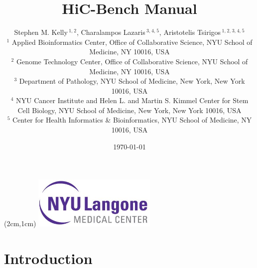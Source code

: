 \documentclass{article}\usepackage[]{graphicx}\usepackage[]{color}
\begin{document}


\title{HiC-Bench Manual}
\author{Stephen M. Kelly\,$^{1,}$$^{2}$, Charalampos Lazaris\,$^{3,}$$^{4,}$$^{5}$, Aristotelis Tsirigos\,$^{1,}$$^{2,}$$^{3,}$$^{4,}$$^{5}$
\\
\footnotesize $^{1}$ Applied Bioinformatics Center, Office of Collaborative Science, NYU School of Medicine, NY 10016, USA\\
\footnotesize $^{2}$ Genome Technology Center, Office of Collaborative Science, NYU School of Medicine, NY 10016, USA\\
\footnotesize $^{3}$ Department of Pathology, NYU School of Medicine, New York, New York 10016, USA\\
\footnotesize $^{4}$ NYU Cancer Institute and Helen L. and Martin S. Kimmel Center for Stem Cell Biology, NYU School of Medicine, New York, New York 10016, USA\\
\footnotesize $^{5}$ Center for Health Informatics \& Bioinformatics, NYU School of Medicine, NY 10016, USA\\
}

\date{\today}

\maketitle
{\footnotesize
\textblockorigin{-18pt}{-2pt}
\begin{textblock*}{10cm}(2cm,1cm)
\includegraphics[height=2.5cm,keepaspectratio]{figure/NYULMC_white.jpg}
\end{textblock*}}


{\footnotesize \tableofcontents \listoffigures}

\section{Introduction} %


\clearpage
\end{document}
